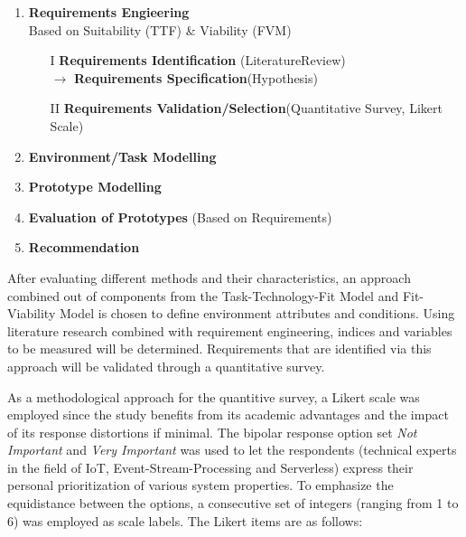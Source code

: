 \begin{enumerate}[nolistsep]
        \item \textbf{Requirements Engieering}\\
            Based on Suitability (TTF) \& Viability (FVM)
            \begin{enumerate}
                \item[I] \textbf{Requirements Identification} (LiteratureReview)\\
                    $\longrightarrow$ \textbf{Requirements Specification}(Hypothesis)
                \item[II] \textbf{Requirements Validation/Selection}(Quantitative Survey, Likert Scale)
            \end{enumerate}
        \item \textbf{Environment/Task Modelling}
        \item \textbf{Prototype Modelling}
        \item \textbf{Evaluation of Prototypes} (Based on Requirements)
        \item \textbf{Recommendation}
\end{enumerate}

After evaluating different methods and their characteristics, an approach combined out of components from the Task-Technology-Fit Model and Fit-Viability Model is chosen to define environment attributes and conditions. Using literature research combined with requirement engineering, indices and variables to be measured will be determined. Requirements that are identified via this approach will be validated through a quantitative survey. 

As a methodological approach for the quantitive survey, a Likert scale was employed since the study benefits from its academic advantages and the impact of its response distortions if minimal. The bipolar response option set \textit{Not Important} and \textit{Very Important} was used to let the respondents (technical experts in the field of IoT, Event-Stream-Processing and Serverless) express their personal prioritization of various system properties. To emphasize the equidistance between the options, a consecutive set of integers (ranging from 1 to 6) was employed as scale labels. The Likert items are as follows:

